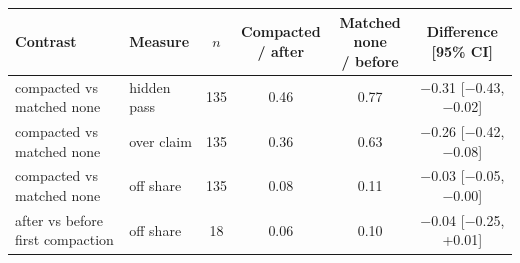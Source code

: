 \begin{tabular}{llcccc}
\toprule
Contrast & Measure & $n$ & \makecell{Compacted\\/ after} & \makecell{Matched none\\/ before} & \makecell{Difference\\{}[95\% CI]} \\
\midrule
compacted vs matched none & hidden pass & 135 & 0.46 & 0.77 & $-$0.31 [$-$0.43, $-$0.02] \\
compacted vs matched none & over claim & 135 & 0.36 & 0.63 & $-$0.26 [$-$0.42, $-$0.08] \\
compacted vs matched none & off share & 135 & 0.08 & 0.11 & $-$0.03 [$-$0.05, $-$0.00] \\
after vs before first compaction & off share & 18 & 0.06 & 0.10 & $-$0.04 [$-$0.25, +0.01] \\
\bottomrule
\end{tabular}
